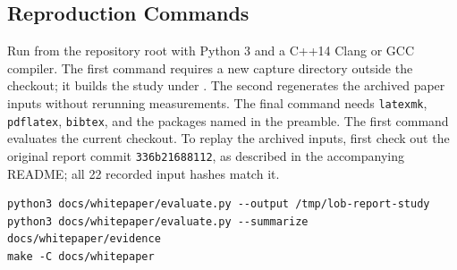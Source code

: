 \documentclass[10pt,letterpaper,twocolumn]{article}
\newcommand{\code}[1]{\texttt{#1}}
\begin{document}
\subsection*{Reproduction Commands}
Run from the repository root with Python 3 and a C++14 Clang or GCC compiler.
The first command requires a new capture directory outside the checkout;
it builds the study under . The second regenerates the
archived paper inputs without rerunning measurements. The final command needs
\code{latexmk}, \code{pdflatex}, \code{bibtex}, and the packages named in the preamble.
The first command evaluates the current checkout. To replay the archived
inputs, first check out the original report commit \code{336b21688112}, as
described in the accompanying README; all 22 recorded input hashes match it.
\begin{verbatim}
python3 docs/whitepaper/evaluate.py --output /tmp/lob-report-study
python3 docs/whitepaper/evaluate.py --summarize docs/whitepaper/evidence
make -C docs/whitepaper
\end{verbatim}
\end{document}
